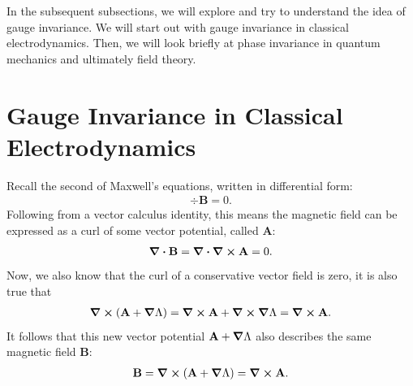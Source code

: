 \documentclass{book}
\numberwithin{equation}{section}
\theoremstyle{definition}
\begin{document}
In the subsequent subsections, we will explore and try to understand the idea of gauge invariance. We will start out with gauge invariance in classical electrodynamics. Then, we will look briefly at phase invariance in quantum mechanics and ultimately field theory.  
\section{Gauge Invariance in Classical Electrodynamics}
Recall the second of Maxwell's equations, written in differential form:
\begin{align}
\div{\mathbf{B}} = 0.
\end{align}
Following from a vector calculus identity, this means the magnetic field can be expressed as a curl of some vector potential, called $\mathbf{A}$:
\begin{align}
\div{\mathbf{B}} = \div{\curl\mathbf{A}} = 0.
\end{align}
Now, we also know that the curl of a conservative vector field is zero, it is also true that
\begin{align}
\curl{(\mathbf{A} + \grad{\Lambda})}= \curl{\mathbf{A}} + \curl{\grad{\Lambda}} = \curl{\mathbf{A}}.
\end{align}
It follows that this new vector potential $\mathbf{A} + \grad{\Lambda}$ also describes the same magnetic field $\mathbf{B}$:
\begin{align}
\mathbf{B} = \curl{(\mathbf{A} + \grad{\Lambda})} = \curl{\mathbf{A}}.
\end{align}
\end{document}
